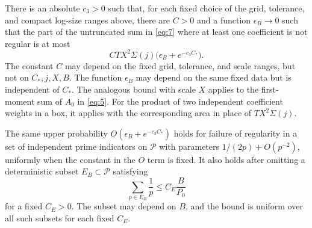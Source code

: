 \begin{lemma}
\label{lem:arith-regularity-loss}
There is an absolute $c_3>0$ such that, for each fixed choice of the grid,
tolerance, and compact log-size ranges above, there are $C>0$ and a function
$\epsilon_B\to0$ such that the part of the
untruncated sum in \eqref{eq:7} where at least one coefficient is not
regular is at most
\begin{equation}
 C TX^2\Sigma(j)\bigl(\epsilon_B+e^{-c_3C_*}\bigr).
 \label{eq:9}
\end{equation}
The constant $C$ may depend on the fixed grid, tolerance, and scale ranges,
but not on $C_*,j,X,B$.  The function $\epsilon_B$ may depend on the same
fixed data but is independent of $C_*$.  The analogous bound with scale $X$
applies to the first-moment sum of $A_0$ in \eqref{eq:5}.  For the product of
two independent coefficient
weights in a box, it applies with the corresponding area in place of
$TX^2\Sigma(j)$.

The same upper probability $O(\epsilon_B+e^{-c_3C_*})$ holds for failure of
regularity in a set of independent prime indicators on $\mathcal P$ with
parameters $1/(2p)+O(p^{-2})$, uniformly when the constant in the $O$ term
is fixed.  It also holds after omitting a deterministic subset
$E_B\subset\mathcal P$ satisfying
\[
 \sum_{p\in E_B}\frac1p\le C_E\frac{B}{P_0}
\]
for a fixed $C_E>0$.  The subset may depend on $B$, and the bound is uniform
over all such subsets for each fixed $C_E$.
\end{lemma}

